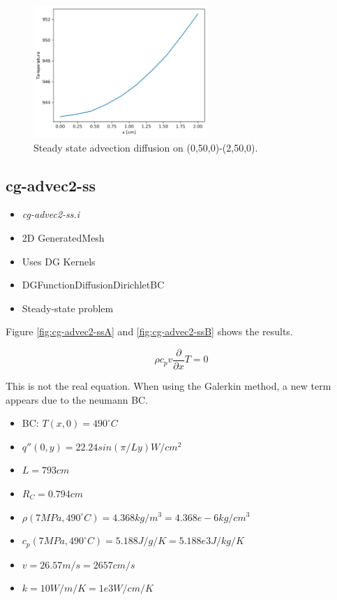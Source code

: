 \documentclass[11pt,letterpaper]{article}
\begin{document}
	\begin{figure}[htbp!]
		\centering
		\includegraphics[height=5cm]{cg-advec1-ssC}
		\caption{Steady state advection diffusion on (0,50,0)-(2,50,0).}
		\label{fig:cg-advec1-ssB}
	\end{figure}

	\subsection{cg-advec2-ss}

	\begin{itemize}
		\item \textit{cg-advec2-ss.i}
		\item 2D GeneratedMesh
		\item Uses DG Kernels
		\item DGFunctionDiffusionDirichletBC
		\item Steady-state problem
	\end{itemize}

    Figure \ref{fig:cg-advec2-ssA} and \ref{fig:cg-advec2-ssB} shows the results.

	\begin{equation}
    \rho c_p v \frac{\partial}{\partial x} T = 0
	\end{equation}

	This is not the real equation. When using the Galerkin method, a new term appears due to the neumann BC.

	\begin{itemize}
		\item BC: $T(x, 0) = 490^{\circ}C$
		\item $q''(0, y) = 22.24 sin (\pi/L y) W/cm^2$
		\item $L = 793 cm$
		\item $R_C = 0.794 cm$
		\item $\rho (7 MPa, 490^{\circ}C) = 4.368 kg/m^3 = 4.368e-6 kg/cm^3$
		\item $c_p (7 MPa, 490^{\circ}C) = 5.188 J/g/K = 5.188e3 J/kg/K$
		\item $v = 26.57 m/s = 2657 cm/s$
		\item $k = 10 W/m/K = 1e3 W/cm/K$
	\end{itemize}
\end{document}
